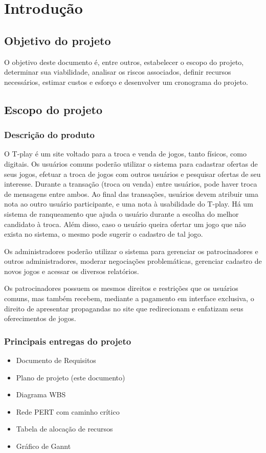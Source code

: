 \documentclass[a4paper,11pt]{article}
\begin{document}
\tableofcontents
\newpage

\section{Introdução}
	\subsection{Objetivo do projeto}
		O objetivo deste documento é, entre outros, estabelecer o escopo do projeto, determinar sua viabilidade, analisar os riscos associados, definir recursos necessários, estimar custos e esforço e desenvolver um cronograma do projeto.

	\subsection{Escopo do projeto}
		\subsubsection{Descrição do produto}
			O T-play é  um site voltado para a troca e venda de jogos, tanto físicos, como digitais.
			Os usuários comuns poderão utilizar o sistema para cadastrar ofertas de seus jogos, efetuar a troca de jogos com outros usuários e 
pesquisar ofertas de seu interesse.
			Durante a transação (troca ou venda) entre usuários, pode haver troca de mensagens entre ambos.
			Ao final das transações, usuários devem atribuir uma nota ao outro usuário participante, e uma nota à usabilidade do T-play.
			Há um sistema de ranqueamento que ajuda o usuário durante a escolha do melhor candidato à troca.
			Além disso, caso o usuário queira ofertar um jogo que não exista no sistema, o mesmo pode sugerir o cadastro de tal jogo.
			
			Os administradores poderão utilizar o sistema para gerenciar os patrocinadores e outros administradores, moderar negociações problemáticas, gerenciar cadastro de novos jogos e acessar os diversos relatórios.

			Os patrocinadores possuem os mesmos direitos e restrições que os usuários comuns, mas também recebem, mediante a pagamento em interface exclusiva, o direito de apresentar propagandas no site que redirecionam e enfatizam seus oferecimentos de jogos.

		\subsubsection{Principais entregas do projeto}
			\begin{itemize}
				\item Documento de Requisitos
				\item Plano de projeto (este documento)
				\item Diagrama WBS
				\item Rede PERT com caminho crítico
				\item Tabela de alocação de recursos
				\item Gráfico de Gannt
			\end{itemize}
\end{document}
